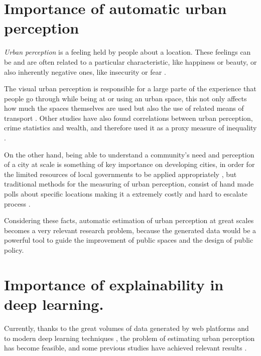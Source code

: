 \section{Importance of automatic urban perception}

\textit{Urban perception} is a feeling held by people about a location. These feelings can be and
are often related to a particular characteristic, like happiness or beauty, or also
inherently negative ones, like insecurity or fear \cite{tamara_judgments}.

The visual urban perception is  responsible for a large parte of the experience that people
go through while  being at or using an urban space, this not only affects how much the spaces
themselves are used \cite{khisty} but also the use of related means of transport \cite{antonakos}.
Other studies have also found correlations between urban perception, crime statistics \cite{tamara_judgments}
and wealth, and therefore used it as a proxy measure of inequality \cite{tamara_judgments,hidalgo_inequality, rossetti}.

On the other hand, being able to understand a community's need and perception of a city at scale is something
of key importance on developing cities, in order for the limited  resources of local governments to be applied
appropriately \cite{santani}, but traditional methods for the measuring of urban perception, consist of hand made polls
about specific locations making it a extremely costly and hard to escalate process \cite{clifton}.

Considering these facts, automatic estimation of urban perception at great scales becomes a very relevant
research problem, because the generated data would be a powerful tool to guide the improvement of
public spaces and the design of public policy.

\section{Importance of explainability in deep learning.}

Currently, thanks to the great volumes of data generated by web platforms \cite{hidalgo_inequality}
and to modern deep learning techniques \cite{lecun_dl}, the problem of estimating urban perception
has become feasible, and some previous studies have achieved relevant results \cite{hidalgo_placepulse,rossetti}.

